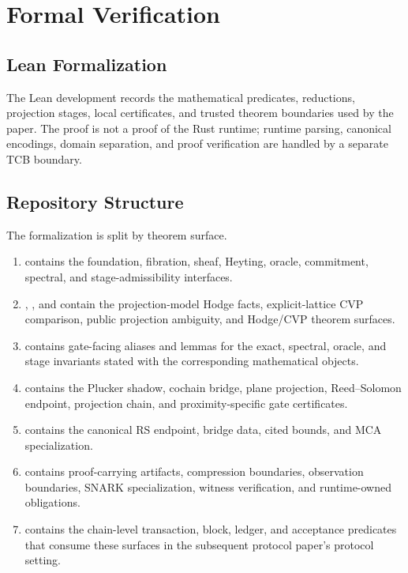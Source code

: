 \section{Formal Verification}

\subsection{Lean Formalization}

The Lean development records the mathematical predicates, reductions,
projection stages, local certificates, and trusted theorem boundaries used by
the paper. The proof is not a proof of the Rust runtime; runtime parsing,
canonical encodings, domain separation, and proof verification are handled by a
separate TCB boundary.

\subsection{Repository Structure}

The formalization is split by theorem surface.
\begin{enumerate}[label=(\roman*)]
  \item {} contains the foundation, fibration, sheaf, Heyting,
    oracle, commitment, spectral, and stage-admissibility interfaces.
  \item {}, , and  contain the
    projection-model Hodge facts, explicit-lattice CVP comparison, public
    projection ambiguity, and Hodge/CVP theorem surfaces.
  \item {} contains gate-facing aliases and lemmas for the exact,
    spectral, oracle, and stage invariants stated with the corresponding
    mathematical objects.
  \item {} contains the Plucker shadow, cochain bridge, plane
    projection, Reed--Solomon endpoint, projection chain, and
    proximity-specific gate certificates.
  \item {} contains the canonical RS endpoint,
    bridge data, cited bounds, and MCA specialization.
  \item {} contains proof-carrying artifacts, compression boundaries,
    observation boundaries, SNARK specialization, witness verification, and
    runtime-owned obligations.
  \item {} contains the chain-level transaction, block, ledger, and
    acceptance predicates that consume these surfaces in the subsequent
    protocol paper's
    protocol setting.
\end{enumerate}

